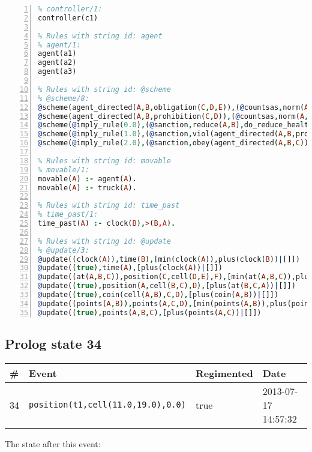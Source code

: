 \documentclass[11pt]{article}\usepackage[utf8]{inputenc}\usepackage{geometry}
\begin{document}
\begin{lstlisting}[language=Prolog, numbers=left]
% Rules with string id: controller
% controller/1:
controller(c1)

% Rules with string id: agent
% agent/1:
agent(a1)
agent(a2)
agent(a3)

% Rules with string id: @scheme
% @scheme/8:
@scheme(agent_directed(A,B,obligation(C,D,E)),(@countsas,norm(A,B,F,obligation(C,D,E)),F),false,(listTrue(C)),(time_past(D)),false,[plus(viol(agent_directed(A,B,obligation(C,D,E))))|[]],[plus(obey(agent_directed(A,B,obligation(C,D,E))))|[]])
@scheme(agent_directed(A,B,prohibition(C,D)),(@countsas,norm(A,B,E,prohibition(C,D)),E),(listTrue(C)),false,(false),false,[plus(viol(agent_directed(A,B,prohibition(C,D))))|[]],[plus(obey(agent_directed(A,B,prohibition(C,D))))|[]])
@scheme(@imply_rule(0.0),(@sanction,reduce(A,B),do_reduce_health(A,B),notifyAgent(A,changed(status))),true,false,false,false,[min(reduce(A,B))|[]],[])
@scheme(@imply_rule(1.0),(@sanction,viol(agent_directed(A,B,prohibition(C,D))),do_sanction(D)),true,false,false,false,[min(viol(agent_directed(A,B,prohibition(C,D))))|[]],[])
@scheme(@imply_rule(2.0),(@sanction,obey(agent_directed(A,B,C))),true,false,false,false,[min(obey(agent_directed(A,B,C)))|[]],[])

% Rules with string id: movable
% movable/1:
movable(A) :- agent(A).
movable(A) :- truck(A).

% Rules with string id: time_past
% time_past/1:
time_past(A) :- clock(B),>(B,A).

% Rules with string id: @update
% @update/3:
@update((clock(A)),time(B),[min(clock(A)),plus(clock(B))|[]])
@update((true),time(A),[plus(clock(A))|[]])
@update((at(A,B,C)),position(C,cell(D,E),F),[min(at(A,B,C)),plus(at(D,E,C))|[]])
@update((true),position(A,cell(B,C),D),[plus(at(B,C,A))|[]])
@update((true),coin(cell(A,B),C,D),[plus(coin(A,B))|[]])
@update((points(A,B)),points(A,C,D),[min(points(A,B)),plus(points(A,D))|[]])
@update((true),points(A,B,C),[plus(points(A,C))|[]])

\end{lstlisting}
\clearpage 
\subsection{Prolog state 34}
\begin{table}[ht]
\centering 
\begin{tabular}{l l l l} 
\textbf{\#} & \textbf{Event} & \textbf{Regimented} & \textbf{Date} \\ [0.5ex] 
\hline
34&\texttt{position(t1,cell(11.0,19.0),0.0)}&true&2013-07-17 14:57:32\\ [1ex] \hline\end{tabular}
\end{table}
The state after this event:
\end{document}
